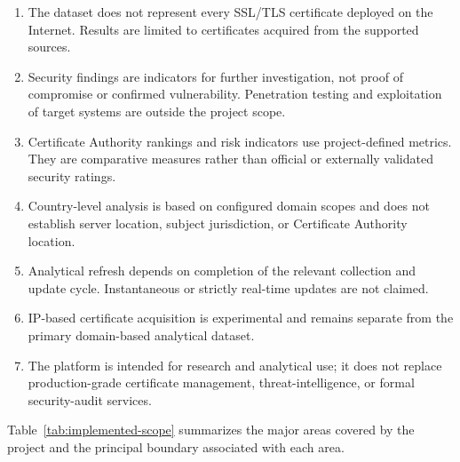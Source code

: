 \begin{enumerate}[label=\arabic*.,leftmargin=0.42in]
  \item The dataset does not represent every SSL/TLS certificate deployed on the Internet. Results are limited to certificates acquired from the supported sources.

  \item Security findings are indicators for further investigation, not proof of compromise or confirmed vulnerability. Penetration testing and exploitation of target systems are outside the project scope.

  \item Certificate Authority rankings and risk indicators use project-defined metrics. They are comparative measures rather than official or externally validated security ratings.

  \item Country-level analysis is based on configured domain scopes and does not establish server location, subject jurisdiction, or Certificate Authority location.

  \item Analytical refresh depends on completion of the relevant collection and update cycle. Instantaneous or strictly real-time updates are not claimed.

  \item IP-based certificate acquisition is experimental and remains separate from the primary domain-based analytical dataset.

  \item The platform is intended for research and analytical use; it does not replace production-grade certificate management, threat-intelligence, or formal security-audit services.
\end{enumerate}

Table~\ref{tab:implemented-scope} summarizes the major areas covered by the
project and the principal boundary associated with each area.

